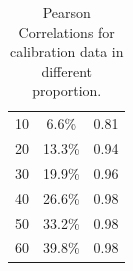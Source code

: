 \documentclass[11pt,letterpaper]{article}
\begin{document}
\begin{table}
\begin{center}
\begin{tabular}{cc|c}
10                                                & 6.6\%                                      & 0.81                                                                                                                                    \\
20                                                & 13.3\%                                     & 0.94 \\
30                                                & 19.9\%                                     & 0.96 \\
40                                                & 26.6\%                                     & 0.98 \\
50                                                & 33.2\%                                     & 0.98                                                                                                                                   \\ 
60                                                & 39.8\%                                     & 0.98 \\ \hline
\end{tabular}
\end{center}
\caption{\label{spearmansen} Pearson Correlations for calibration data in different proportion. 
}
\end{table}
\end{document}
